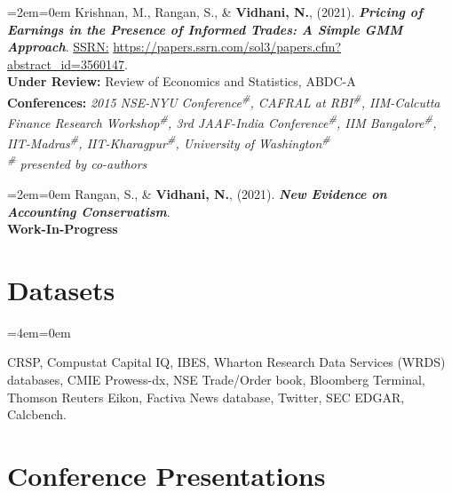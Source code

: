 \documentclass[11pt,a4paper,]{moderncv}
\begin{document}
%
  \par%
  \medskip
  \leftskip=2em\rightskip=0em%
  \noindent\ignorespaces
Krishnan, M., Rangan, S., \& \textbf{Vidhani, N.}, (2021). \textbf{\textit{Pricing of Earnings in the Presence of Informed Trades: A Simple GMM Approach}}. \underline{SSRN:} \url{https://papers.ssrn.com/sol3/papers.cfm?abstract_id=3560147}.\\
\textbf{Under Review:} Review of Economics and Statistics, ABDC-A\textsuperscript{\textasteriskcentered}\\
\textbf{Conferences:} \textit{2015 NSE-NYU Conference\textsuperscript{\#}, CAFRAL at RBI\textsuperscript{\#}, IIM-Calcutta Finance Research Workshop\textsuperscript{\#}, 3rd JAAF-India Conference\textsuperscript{\#}, IIM Bangalore\textsuperscript{\#}, IIT-Madras\textsuperscript{\#}, IIT-Kharagpur\textsuperscript{\#}, University of Washington\textsuperscript{\#}}\\
\textit{\textsuperscript{\#} presented by co-authors}\\
%
  \par\medskip

%
  \par%
  \medskip
  \leftskip=2em\rightskip=0em%
  \noindent\ignorespaces
Rangan, S., \& \textbf{Vidhani, N.}, (2021). \textbf{\textit{New Evidence on Accounting Conservatism}}.\\
\textbf{Work-In-Progress}\\
%
  \par\medskip

\endgroup

\hypertarget{datasets}{%
\section{Datasets}\label{datasets}}

\begingroup
%
  \par%
  \medskip
  \leftskip=4em\rightskip=0em%
  \noindent\ignorespaces

CRSP, Compustat Capital IQ, IBES, Wharton Research Data Services (WRDS) databases, CMIE Prowess-dx, NSE Trade/Order book, Bloomberg Terminal, Thomson Reuters Eikon, Factiva News database, Twitter, SEC EDGAR, Calcbench.

%
  \par\medskip
\endgroup

\hypertarget{conference-presentations}{%
\section{Conference Presentations}\label{conference-presentations}}
\end{document}

